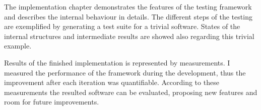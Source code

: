 The implementation chapter demonstrates the features of the testing framework and describes the internal behaviour in details. The different steps of the testing are exemplified by generating a test suite for a trivial software. States of the internal structures and intermediate results are showed also regarding this trivial example.

Results of the finished implementation is represented by measurements. I measured the performance of the framework during the development, thus the improvement after each iteration was quantifiable. According to these measurements the resulted software can be evaluated, proposing new features and room for future improvements.

\vfill
\dolgozatnyelve
{}

\setcounter{romanPage}{\value{page}}

